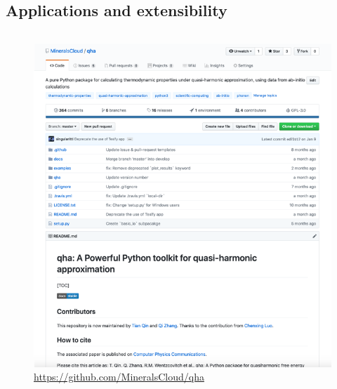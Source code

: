 \documentclass[13pt,aspectratio=169]{beamer}
\begin{document}
\subsection{Applications and extensibility}
\begin{frame}{\subsecname}
	\begin{columns}
		\begin{column}{0.45\textwidth}
			\begin{figure}
				\includegraphics[height=0.7\textheight]{images/website}%
				\captionsetup{labelformat=empty}
				\caption{\scriptsize\url{https://github.com/MineralsCloud/qha}}
			\end{figure}
		\end{column}


\end{columns}
\end{frame}
\end{document}
